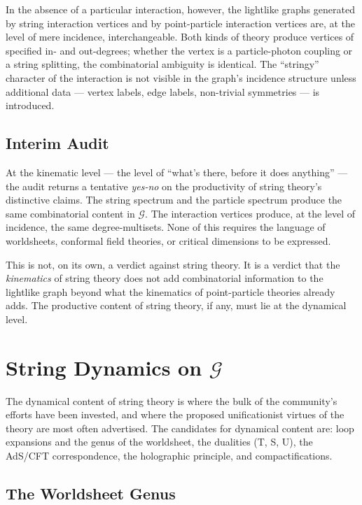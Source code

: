 \documentclass[11pt]{article}
\begin{document}
In the absence of a particular interaction, however, the lightlike graphs generated by string interaction vertices and by point-particle interaction vertices are, at the level of mere incidence, interchangeable. Both kinds of theory produce vertices of specified in- and out-degrees; whether the vertex is a particle-photon coupling or a string splitting, the combinatorial ambiguity is identical. The ``stringy'' character of the interaction is not visible in the graph's incidence structure unless additional data --- vertex labels, edge labels, non-trivial symmetries --- is introduced.

\subsection{Interim Audit}

At the kinematic level --- the level of ``what's there, before it does anything'' --- the audit returns a tentative \emph{yes-no} on the productivity of string theory's distinctive claims. The string spectrum and the particle spectrum produce the same combinatorial content in $\mathcal{G}$. The interaction vertices produce, at the level of incidence, the same degree-multisets. None of this requires the language of worldsheets, conformal field theories, or critical dimensions to be expressed.

This is not, on its own, a verdict against string theory. It is a verdict that the \emph{kinematics} of string theory does not add combinatorial information to the lightlike graph beyond what the kinematics of point-particle theories already adds. The productive content of string theory, if any, must lie at the dynamical level.

\section{String Dynamics on $\mathcal{G}$}

The dynamical content of string theory is where the bulk of the community's efforts have been invested, and where the proposed unificationist virtues of the theory are most often advertised. The candidates for dynamical content are: loop expansions and the genus of the worldsheet, the dualities (T, S, U), the AdS/CFT correspondence, the holographic principle, and compactifications.

\subsection{The Worldsheet Genus}
\end{document}
